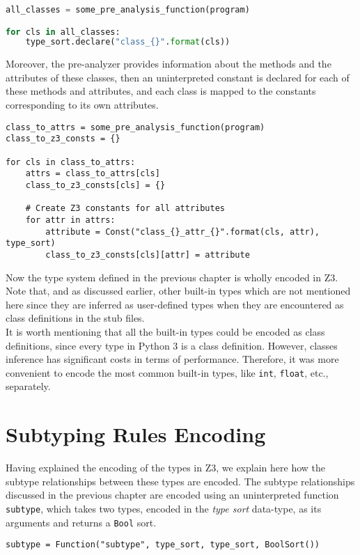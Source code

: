 \begin{lstlisting}[language=python]
all_classes = some_pre_analysis_function(program)

for cls in all_classes:
	type_sort.declare("class_{}".format(cls))
\end{lstlisting}

Moreover, the pre-analyzer provides information about the methods and the attributes of these classes, then an uninterpreted constant is declared for each of these methods and attributes, and each class is mapped to the constants corresponding to its own attributes.

\begin{lstlisting}
class_to_attrs = some_pre_analysis_function(program)
class_to_z3_consts = {}

for cls in class_to_attrs:
    attrs = class_to_attrs[cls]
    class_to_z3_consts[cls] = {}
    
    # Create Z3 constants for all attributes
    for attr in attrs:
	    attribute = Const("class_{}_attr_{}".format(cls, attr), type_sort)
	    class_to_z3_consts[cls][attr] = attribute
\end{lstlisting}

Now the type system defined in the previous chapter is wholly encoded in Z3. Note that, and as discussed earlier, other built-in types which are not mentioned here since they are inferred as user-defined types when they are encountered as class definitions in the stub files.\\

It is worth mentioning that all the built-in types could be encoded as class definitions, since every type in Python 3 is a class definition. However, classes inference has significant costs in terms of performance. Therefore, it was more convenient to encode the most common built-in types, like \lstinline|int|, \lstinline|float|, etc., separately.

\section{Subtyping Rules Encoding}
Having explained the encoding of the types in Z3, we explain here how the subtype relationships between these types are encoded. The subtype relationships discussed in the previous chapter are encoded using an uninterpreted function \lstinline|subtype|, which takes two types, encoded in the \textit{type sort} data-type, as its arguments and returns a \lstinline|Bool| sort.
\begin{lstlisting}
subtype = Function("subtype", type_sort, type_sort, BoolSort())
\end{lstlisting}

